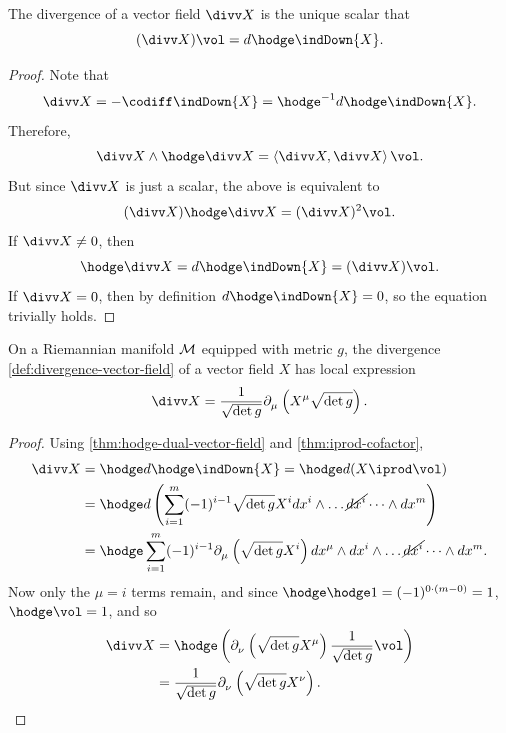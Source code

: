 \documentclass[../main.tex]{subfiles}
\begin{document}
    \begin{theorem}[]\label{thm:divergence-vector-field-volume-form}
        The divergence of a vector field \(\divv X\) is the unique scalar that 
        \[
        (\divv X)\vol = d\hodge \indDown{X}.
        \]
    \end{theorem}
    \begin{proof}
        Note that 
        \[
        \divv X = -\codiff \indDown{X} = \hodge ^{-1} d \hodge \indDown{X}.
        \]
        Therefore, 
        \[
        \divv X \wedge \hodge \divv X = \left<\divv X, \divv X\right>\vol.
        \]
        But since \(\divv X\) is just a scalar, the above is equivalent to 
        \[
        (\divv X)\hodge \divv X = (\divv X)^2\vol.
        \]
        If \(\divv X \neq 0\), then 
        \[
        \hodge \divv X = d\hodge \indDown{X} = (\divv X)\vol.
        \]
        If \(\divv X=0\), then by definition \(d\hodge \indDown{X}=0\), so the 
        equation trivially holds.
    \end{proof}
    \begin{theorem}\label{thm:divergence-coordinates}
        On a Riemannian manifold \(\manifold[M]\) equipped with metric \(g\), the 
        divergence \cref{def:divergence-vector-field} of a vector field \(X\) has 
        local expression
        \[
        \divv X = \frac{1}{\sqrt{\det g}}\tfld{\mu}\left(X^\mu\sqrt{\det g}\right).
        \]
    \end{theorem}
    \begin{proof}
        Using \cref{thm:hodge-dual-vector-field} and \cref{thm:iprod-cofactor}, 
        \[
        \begin{aligned}
            \divv X &= \hodge d \hodge \indDown{X} = \hodge d(X \iprod \vol)\\
            &=\hodge d \left(\sum_{i=1}^{m} (-1)^{i-1}\sqrt{\det g}X^i
            dx^i\wedge \dots \cancel{dx^i}\dots \wedge dx^m\right)\\
            &=\hodge \sum_{i=1}^{m} (-1)^{i-1}\tfld{\mu} \left(\sqrt{\det g}X^i\right)
            dx^\mu\wedge dx^i\wedge \dots \cancel{dx^i}\dots \wedge dx^m.
        \end{aligned}
        \]
        Now only the \(\mu=i\) terms remain, and since \(\hodge\hodge1=(-1)^{0\cdot
        (m-0)}=1\), \(\hodge \vol=1\), and so 
        \[
        \begin{aligned}
            \divv X &= \hodge \left(\tfld{\nu}\left(\sqrt{\det g}X^\mu\right)
            \frac{1}{\sqrt{\det g}}\vol\right)\\
            &=\frac{1}{\sqrt{\det g}}\tfld{\nu}\left(\sqrt{\det g}X^\nu\right).
        \end{aligned}
        \]
    \end{proof}
\end{document}
